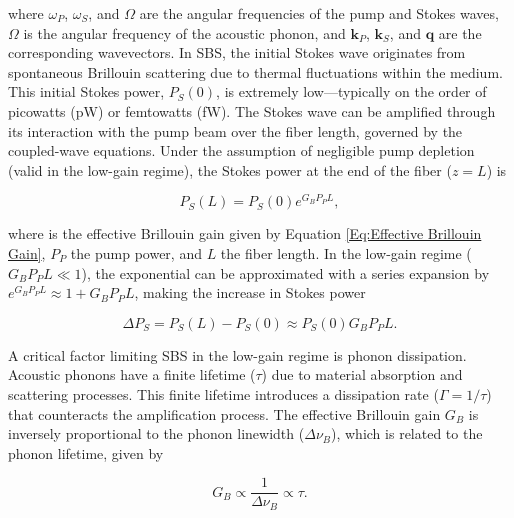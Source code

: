 \documentclass[%
  reprint,
  superscriptaddress,
  amsmath,amssymb,
  aps,
  prapplied,
]{revtex4-2}
\begin{document}
where $\omega_{P}$, $\omega_{S}$, and $\Omega$ are the angular frequencies of the pump and Stokes waves, $\Omega$ is the angular frequency of the acoustic phonon, and $\mathbf{k}_{P}$, $\mathbf{k}_{S}$, and $\mathbf{q}$ are the corresponding wavevectors. In SBS, the initial Stokes wave originates from spontaneous Brillouin scattering due to thermal fluctuations within the medium. This initial Stokes power, $P_{S}(0)$, is extremely low—typically on the order of picowatts (pW) or femtowatts (fW). The Stokes wave can be amplified through its interaction with the pump beam over the fiber length, governed by the coupled-wave equations. Under the assumption of negligible pump depletion (valid in the low-gain regime), the Stokes power at the end of the fiber ($z = L$) is

\begin{equation}
P_{S}(L) = P_{S}(0) e^{G_{B} P_{P} L},
\end{equation}

where is the effective Brillouin gain given by Equation \ref{Eq:Effective Brillouin Gain}, $P_{P}$ the pump power, and $L$ the fiber length. In the low-gain regime ($G_{B} P_{P} L \ll 1$), the exponential can be approximated with a series expansion by $e^{G_{B}P_{P}L} \approx 1 + G_{B}P_{P}L$, making the increase in Stokes power

\begin{equation}
\Delta P_S = P_S(L) - P_S(0) \approx P_S(0) G_{B}P_{P}L.
\end{equation}

A critical factor limiting SBS in the low-gain regime is phonon dissipation. Acoustic phonons have a finite lifetime ($\tau$) due to material absorption and scattering processes. This finite lifetime introduces a dissipation rate ($\Gamma = 1/\tau$) that counteracts the amplification process. The effective Brillouin gain $G_{B}$ is inversely proportional to the phonon linewidth ($\Delta \nu_{B}$), which is related to the phonon lifetime, given by

\begin{equation}
G_{B} \propto \frac{1}{\Delta \nu_{B}} \propto \tau.
\end{equation}
\end{document}
